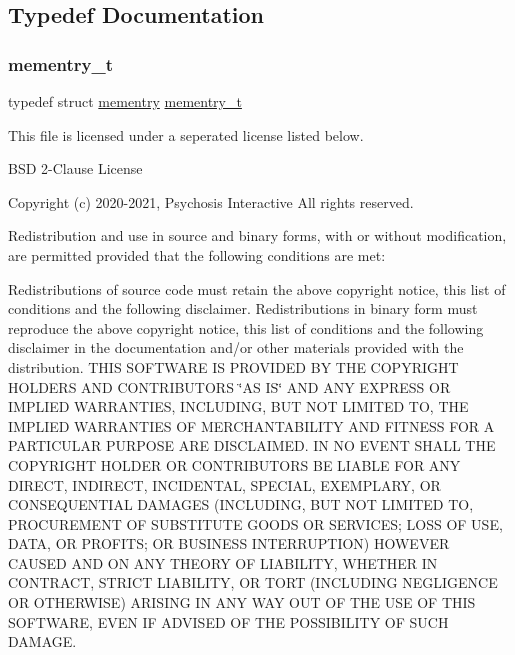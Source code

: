 \subsection{Typedef Documentation}
\mbox{\label{a00116_a876b6ee19692762a87e4673911f9b8da_a876b6ee19692762a87e4673911f9b8da}} 
\subsubsection{\texorpdfstring{mementry\+\_\+t}{mementry\_t}}
{\footnotesize\ttfamily typedef struct \hyperlink{a00170}{mementry}  \hyperlink{a00116_a876b6ee19692762a87e4673911f9b8da_a876b6ee19692762a87e4673911f9b8da}{mementry\+\_\+t}}



This file is licensed under a seperated license listed below. 

B\+SD 2-\/\+Clause License

Copyright (c) 2020-\/2021, Psychosis Interactive All rights reserved.

Redistribution and use in source and binary forms, with or without modification, are permitted provided that the following conditions are met\+:

Redistributions of source code must retain the above copyright notice, this list of conditions and the following disclaimer. Redistributions in binary form must reproduce the above copyright notice, this list of conditions and the following disclaimer in the documentation and/or other materials provided with the distribution. T\+H\+IS S\+O\+F\+T\+W\+A\+RE IS P\+R\+O\+V\+I\+D\+ED BY T\+HE C\+O\+P\+Y\+R\+I\+G\+HT H\+O\+L\+D\+E\+RS A\+ND C\+O\+N\+T\+R\+I\+B\+U\+T\+O\+RS \char`\"{}\+A\+S I\+S\char`\"{} A\+ND A\+NY E\+X\+P\+R\+E\+SS OR I\+M\+P\+L\+I\+ED W\+A\+R\+R\+A\+N\+T\+I\+ES, I\+N\+C\+L\+U\+D\+I\+NG, B\+UT N\+OT L\+I\+M\+I\+T\+ED TO, T\+HE I\+M\+P\+L\+I\+ED W\+A\+R\+R\+A\+N\+T\+I\+ES OF M\+E\+R\+C\+H\+A\+N\+T\+A\+B\+I\+L\+I\+TY A\+ND F\+I\+T\+N\+E\+SS F\+OR A P\+A\+R\+T\+I\+C\+U\+L\+AR P\+U\+R\+P\+O\+SE A\+RE D\+I\+S\+C\+L\+A\+I\+M\+ED. IN NO E\+V\+E\+NT S\+H\+A\+LL T\+HE C\+O\+P\+Y\+R\+I\+G\+HT H\+O\+L\+D\+ER OR C\+O\+N\+T\+R\+I\+B\+U\+T\+O\+RS BE L\+I\+A\+B\+LE F\+OR A\+NY D\+I\+R\+E\+CT, I\+N\+D\+I\+R\+E\+CT, I\+N\+C\+I\+D\+E\+N\+T\+AL, S\+P\+E\+C\+I\+AL, E\+X\+E\+M\+P\+L\+A\+RY, OR C\+O\+N\+S\+E\+Q\+U\+E\+N\+T\+I\+AL D\+A\+M\+A\+G\+ES (I\+N\+C\+L\+U\+D\+I\+NG, B\+UT N\+OT L\+I\+M\+I\+T\+ED TO, P\+R\+O\+C\+U\+R\+E\+M\+E\+NT OF S\+U\+B\+S\+T\+I\+T\+U\+TE G\+O\+O\+DS OR S\+E\+R\+V\+I\+C\+ES; L\+O\+SS OF U\+SE, D\+A\+TA, OR P\+R\+O\+F\+I\+TS; OR B\+U\+S\+I\+N\+E\+SS I\+N\+T\+E\+R\+R\+U\+P\+T\+I\+ON) H\+O\+W\+E\+V\+ER C\+A\+U\+S\+ED A\+ND ON A\+NY T\+H\+E\+O\+RY OF L\+I\+A\+B\+I\+L\+I\+TY, W\+H\+E\+T\+H\+ER IN C\+O\+N\+T\+R\+A\+CT, S\+T\+R\+I\+CT L\+I\+A\+B\+I\+L\+I\+TY, OR T\+O\+RT (I\+N\+C\+L\+U\+D\+I\+NG N\+E\+G\+L\+I\+G\+E\+N\+CE OR O\+T\+H\+E\+R\+W\+I\+SE) A\+R\+I\+S\+I\+NG IN A\+NY W\+AY O\+UT OF T\+HE U\+SE OF T\+H\+IS S\+O\+F\+T\+W\+A\+RE, E\+V\+EN IF A\+D\+V\+I\+S\+ED OF T\+HE P\+O\+S\+S\+I\+B\+I\+L\+I\+TY OF S\+U\+CH D\+A\+M\+A\+GE. 


